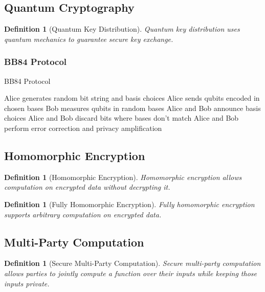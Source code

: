 \documentclass[11pt,a4paper]{article}
\newtheorem{definition}[theorem]{Definition}
\begin{document}
\subsection{Quantum Cryptography}

\begin{definition}[Quantum Key Distribution]
Quantum key distribution uses quantum mechanics to guarantee secure key exchange.
\end{definition}

\subsubsection{BB84 Protocol}

\begin{algorithm}
\caption{BB84 Protocol}
\begin{algorithmic}[1]
\STATE Alice generates random bit string and basis choices
\STATE Alice sends qubits encoded in chosen bases
\STATE Bob measures qubits in random bases
\STATE Alice and Bob announce basis choices
\STATE Alice and Bob discard bits where bases don't match
\STATE Alice and Bob perform error correction and privacy amplification
\end{algorithmic}
\end{algorithm}

\subsection{Homomorphic Encryption}

\begin{definition}[Homomorphic Encryption]
Homomorphic encryption allows computation on encrypted data without decrypting it.
\end{definition}

\begin{definition}[Fully Homomorphic Encryption]
Fully homomorphic encryption supports arbitrary computation on encrypted data.
\end{definition}

\subsection{Multi-Party Computation}

\begin{definition}[Secure Multi-Party Computation]
Secure multi-party computation allows parties to jointly compute a function over their inputs while keeping those inputs private.
\end{definition}
\end{document}
